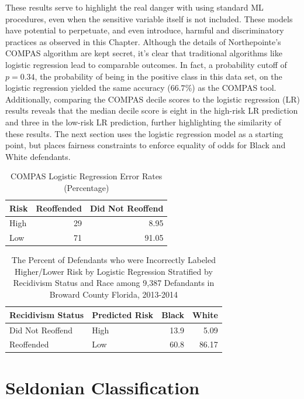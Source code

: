 \documentclass[12pt, twoside]{amherstthesis}
\begin{document}
These results serve to highlight the real danger with using standard ML procedures, even when the sensitive variable itself is not included. These models have potential to perpetuate, and even introduce, harmful and discriminatory practices as observed in this Chapter. Although the details of Northepointe's COMPAS algorithm are kept secret, it's clear that traditional algorithms like logistic regression lead to comparable outcomes. In fact, a probability cutoff of \(p = 0.34\), the probability of being in the positive class in this data set, on the logistic regression yielded the same accuracy (\(66.7\)\%) as the COMPAS tool. Additionally, comparing the COMPAS decile scores to the logistic regression (LR) results reveals that the median decile score is eight in the high-risk LR prediction and three in the low-risk LR prediction, further highlighting the similarity of these results. The next section uses the logistic regression model as a starting point, but places fairness constraints to enforce equality of odds for Black and White defendants.
\begin{table}

\caption{\label{tab:ch3table3}COMPAS Logistic Regression Error Rates (Percentage)}
\centering
\begin{tabular}[t]{lrr}
\toprule
Risk & Reoffended & Did Not Reoffend\\
\midrule
High & 29 & 8.95\\
Low & 71 & 91.05\\
\bottomrule
\end{tabular}
\end{table}
\begin{table}

\caption{\label{tab:ch3table4}The Percent of Defendants who were Incorrectly Labeled Higher/Lower Risk by Logistic Regression Stratified by Recidivism Status and Race among 9,387 Defandants in Broward County Florida, 2013-2014}
\centering
\begin{tabular}[t]{llrr}
\toprule
Recidivism Status & Predicted Risk & Black & White\\
\midrule
Did Not Reoffend & High & 13.9 & 5.09\\
Reoffended & Low & 60.8 & 86.17\\
\bottomrule
\end{tabular}
\end{table}
\hypertarget{seldapp}{%
\section{Seldonian Classification}\label{seldapp}}
\end{document}

